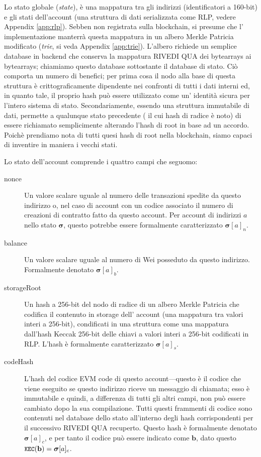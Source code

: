 \documentclass[9pt,oneside]{amsart}
\begin{document}
\begin{multicols}{2}
Lo stato globale (\textit{state}), è una mappatura tra gli indirizzi (identificatori a 160-bit) e gli stati dell'account (una struttura di dati serializzata come RLP, vedere Appendix \ref{app:rlp}). Sebben non registrata sulla blockchain, si presume che l' implementazione manterrà questa mappatura in un albero Merkle Patricia modificato (\textit{trie}, si veda Appendix \ref{app:trie}). L'albero richiede un semplice database in backend che conserva la mappatura RIVEDI QUA dei bytearrays ai bytearrays; chiamiamo questo database sottostante il database di stato. Ciò comporta un numero di benefici; per prima cosa il nodo alla base di questa struttura è crittograficamente dipendente nei confronti di tutti i dati interni ed, in quanto tale, il proprio hash può essere utilizzato come un' identità sicura per l'intero sistema di stato. Secondariamente, essendo una struttura immutabile di dati, permette a qualunque stato precedente ( il cui hash di radice è noto) di essere richiamato semplicimente alterando l'hash di root in base ad un accordo. Poichè prendiamo nota di tutti quesi hash di root nella blockchain, siamo capaci di inventire in maniera i vecchi stati.

Lo stato dell'account comprende i quattro campi che seguomo:

\begin{description}
\item[nonce] Un valore scalare uguale al numero delle transazioni spedite da questo indirizzo o, nel caso di account con un codice associato il numero di creazioni di contratto fatto da questo account. Per account di indirizzi $a$ nello stato $\boldsymbol{\sigma}$, questo potrebbe essere formalmente caratterizzato $\boldsymbol{\sigma}[a]_n$.
\item[balance] Un valore scalare uguale al numero di Wei posseduto da questo indirizzo. Formalmente denotato $\boldsymbol{\sigma}[a]_b$.
\item[storageRoot] Un hash a  256-bit del nodo di radice di un albero Merkle Patricia che codifica il contenuto in storage dell' account (una mappatura tra valori interi a 256-bit), condificati in una struttura come una mappatura dall'hash Keccak 256-bit delle chiavi a valori interi a 256-bit codificati in RLP. L'hash è formalmente caratterizzato $\boldsymbol{\sigma}[a]_s$.
\item[codeHash] L'hash del codice EVM code di questo account---questo è il codice che viene eseguito se questo indirizzo riceve un messaggio di chiamata; esso è immutabile e quindi, a differenza di tutti gli altri campi, non può essere cambiato dopo la sua compilazione. Tutti questi frammenti di codice sono contenuti nel database dello stato all'interno degli hash corrispondenti per il successivo RIVEDI QUA recuperto. Questo hash è formalmente denotato $\boldsymbol{\sigma}[a]_c$, e per tanto il codice può essere indicato come $\mathbf{b}$, dato questo $\texttt{\small KEC}(\mathbf{b}) = \boldsymbol{\sigma}[a]_c$.
\end{description}


\end{multicols}
\end{document}
